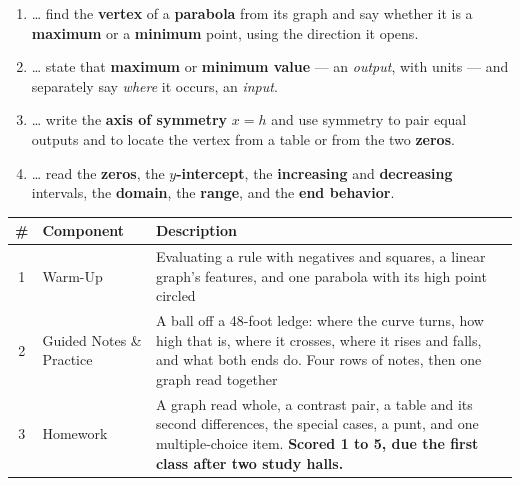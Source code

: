 \documentclass[12pt]{article}
\begin{document}

\namedateperiod
\vspace{0.18in}

\boxguard[14]
\begin{learningtargetbox}
\small
\begin{enumerate}[leftmargin=1.5em, itemsep=5pt]
  \item \ldots{} find the \textbf{vertex} of a \textbf{parabola} from its graph and say whether it
        is a \textbf{maximum} or a \textbf{minimum} point, using the direction it opens.
  \item \ldots{} state that \textbf{maximum} or \textbf{minimum value} --- an \emph{output}, with
        units --- and separately say \emph{where} it occurs, an \emph{input}.
  \item \ldots{} write the \textbf{axis of symmetry} $x=h$ and use symmetry to pair equal outputs
        and to locate the vertex from a table or from the two \textbf{zeros}.
  \item \ldots{} read the \textbf{zeros}, the \textbf{$y$-intercept}, the \textbf{increasing} and
        \textbf{decreasing} intervals, the \textbf{domain}, the \textbf{range}, and the
        \textbf{end behavior}.
\end{enumerate}
\end{learningtargetbox}

\vspace{0.14in}

\boxguard[14]
\begin{tocbox}
\small
\renewcommand{\arraystretch}{1.5}
\begin{tabularx}{\linewidth}{@{} c l X @{}}
\rowcolor{forestbg}
\textbf{\#} & \textbf{Component} & \textbf{Description} \\
\midrule
1 & Warm-Up & Evaluating a rule with negatives and squares, a linear graph's features, and one
              parabola with its high point circled \\
2 & Guided Notes \& Practice & A ball off a 48-foot ledge: where the curve turns, how high that
              is, where it crosses, where it rises and falls, and what both ends do. Four rows of
              notes, then one graph read together \\
3 & Homework & A graph read whole, a contrast pair, a table and its second differences, the
              special cases, a punt, and one multiple-choice item. \textbf{Scored 1 to 5, due the first class after two study halls.} \\
\end{tabularx}
\end{tocbox}
\end{document}
